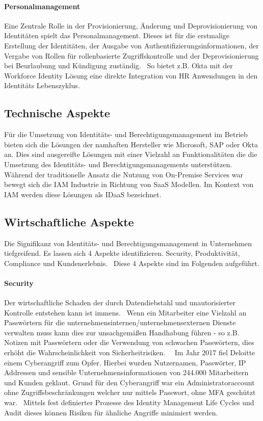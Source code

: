 \documentclass[12pt]{article}
\begin{document}
\paragraph{Personalmanagement}
Eine Zentrale Rolle in der Provisionierung, Änderung und Deprovisionierung von Identitäten spielt das Personalmanagement. Dieses ist für die erstmalige Erstellung der Identitäten, der Ausgabe von Authentifizierungsinformationen, der Vergabe von Rollen für rollenbasierte Zugriffskontrolle und der Deprovisionierung bei Beurlaubung und Kündigung zuständig.~\cite{YOUNG20045} So bietet z.B. Okta mit der Workforce Identity Lösung eine direkte Integration von HR Anwendungen in den Identitäts Lebenszyklus.~\cite{oktahr}
\subsection{Technische Aspekte}
Für die Umsetzung von Identitäts- und Berechtigungsmanagement im Betrieb bieten sich die Lösungen der namhaften Hersteller wie Microsoft, SAP oder Okta an. Dies sind ausgereifte Lösungen mit einer Vielzahl an Funktionalitäten die die Umsetzung des Identitäts- und Berechtigungsmanagements unterstützen. Während der traditionelle Ansatz die Nutzung von On-Premise Services war bewegt sich die IAM Industrie in Richtung von SaaS Modellen. Im Kontext von IAM werden diese Lösungen als IDaaS bezeichnet.~\cite{kunz2014analyzing}
\subsection{Wirtschaftliche Aspekte}
Die Signifikanz von Identitäts- und Berechtigungsmanagement in Unternehmen tiefgreifend. Es lassen sich 4 Aspekte identifizieren. Security, Produktivität, Compliance und Kundenerlebnis.~\cite{mont2010economics}\cite{azhar2014economics} Diese 4 Aspekte sind im Folgenden aufgeführt.
\paragraph{Security}
Der wirtschaftliche Schaden der durch Datendiebstahl und unautorisierter Kontrolle entstehen kann ist immens.~\cite{azhar2014economics} Wenn ein Mitarbeiter eine Vielzahl an Passwörtern für die unternehmensinternen/unternehmensexternen Dienste verwalten muss kann dies zur unsachgemäßen Handhabung führen - so z.B. Notizen mit Passwörtern oder die Verwendung von schwachen Passwörtern, dies erhöht die Wahrscheinlichkeit von Sicherheitrisiken.~\cite{haag2012selecting}~\cite{azhar2014economics} Im Jahr 2017 fiel Deloitte einem Cyberangriff zum Opfer. Hierbei wurden Nutzernamen, Passwörter, IP Addressen und sensible Unternehmensinformationen von 244.000 Mitarbeitern und Kunden geklaut. Grund für den Cyberangriff war ein Administratoraccount ohne Zugriffsbeschränkungen welcher nur mittels Passwort, ohne MFA geschützt war.~\cite{deloitte2017} Mittels fest definierter Prozesse des Identity Management Life Cycles und Audit dieses können Risiken für ähnliche Angriffe minimiert werden.
\end{document}
